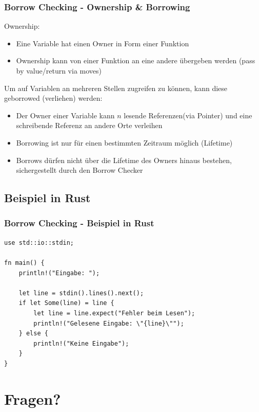 \documentclass{beamer}
\begin{document}
        \begin{frame}
            \frametitle{Borrow Checking - Ownership \& Borrowing}
            Ownership:
            \begin{itemize}
                \item Eine Variable hat einen Owner in Form einer Funktion
                \item Ownership kann von einer Funktion an eine andere übergeben werden (pass by value/return via moves)
            \end{itemize}
            Um auf Variablen an mehreren Stellen zugreifen zu können, kann diese geborrowed (verliehen) werden:
            \begin{itemize}
                \item Der Owner einer Variable kann $n$ lesende Referenzen(via Pointer) und eine schreibende Referenz an andere Orte verleihen
                \item Borrowing ist nur für einen bestimmten Zeitraum möglich (Lifetime)
                \item Borrows dürfen nicht über die Lifetime des Owners hinaus bestehen, sichergestellt durch den Borrow Checker
            \end{itemize}
        \end{frame}

        \subsection{Beispiel in Rust}
        \begin{frame}[fragile]
            \frametitle{Borrow Checking - Beispiel in Rust}

            \begin{verbatim}
use std::io::stdin;

fn main() {
    println!("Eingabe: ");

    let line = stdin().lines().next();
    if let Some(line) = line {
        let line = line.expect("Fehler beim Lesen");
        println!("Gelesene Eingabe: \"{line}\"");
    } else {
        println!("Keine Eingabe");
    }
}
            \end{verbatim}
        \end{frame}

    \section{Fragen?}
\end{document}
